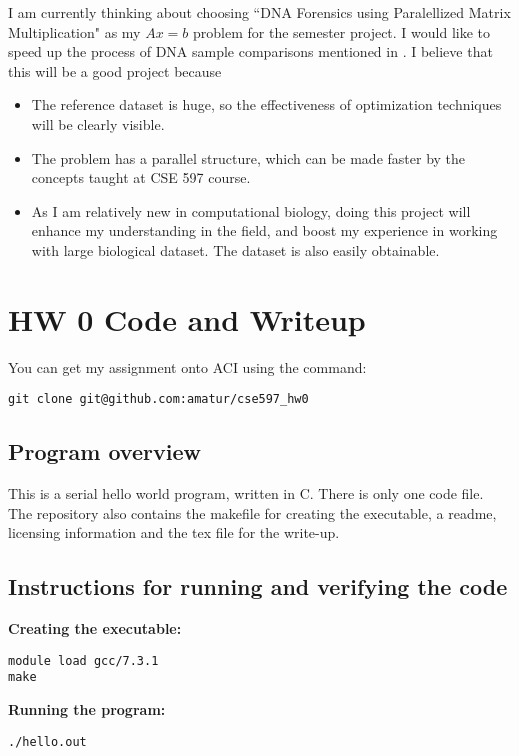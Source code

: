 \documentclass{article}
\begin{document}
\begin{spacing}{1.1}
I am currently thinking about choosing ``DNA Forensics using Paralellized Matrix Multiplication" as my $Ax=b$ problem for the semester project. I would like to speed up the process of DNA sample comparisons mentioned in \cite{samsi2017linear}. I believe that this will be a good project because
\begin{itemize}
  \item The reference dataset is huge, so the effectiveness of optimization techniques will be clearly visible.
  \item The problem has a parallel structure, which can be made faster by the concepts taught at CSE 597 course. 
  \item As I am relatively new in computational biology, doing this project will enhance my understanding in the field, and boost my experience in working with large biological dataset. The dataset is also easily obtainable.
\end{itemize}


\section{HW 0 Code and Writeup}

You can get my assignment onto ACI using the command:

\begin{verbatim}
git clone git@github.com:amatur/cse597_hw0
\end{verbatim}


\subsection{Program overview}

This is a serial hello world program, written in C. There is only one code file. The repository also contains the makefile for creating the executable, a readme, licensing information and the tex file for the write-up.


\subsection{Instructions for running and verifying the code}

\textbf{Creating the executable:}
\begin{verbatim}
module load gcc/7.3.1
make
\end{verbatim}

\textbf{Running the program:}
\begin{verbatim}
./hello.out
\end{verbatim}


\end{spacing}
\end{document}
